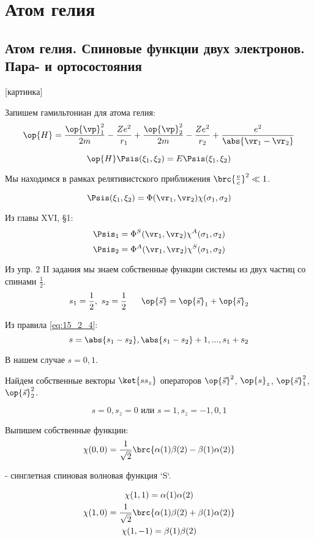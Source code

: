 \chapter{Атом гелия}

\section{Атом гелия. Спиновые функции двух электронов. Пара- и ортосостояния}

[картинка]

Запишем гамильтониан для атома гелия:
\begin{equation}
\label{eq:17_1_1}
\op{H} = \frac{\op{\vp}_1^2}{2m} - \frac{Ze^2}{r_1} + \frac{\op{\vp}_2^2}{2m} - \frac{Ze^2}{r_2} + \frac{e^2}{\abs{\vr_1 - \vr_2}}
\end{equation}

\begin{equation}
\label{eq:17_1_2}
\op{H} \Psis(\xi_1, \xi_2) =E\Psis(\xi_1, \xi_2)
\end{equation}

Мы находимся в рамках релятивистского приближения $\brc{\frac{v}{c}}^2 \ll 1$.

$$
\Psis(\xi_1, \xi_2) = \Phi(\vr_1, \vr_2) \chi(\sigma_1, \sigma_2)
$$

Из главы XVI, \S1:
$$
\Psis_1 = \Phi^S(\vr_1, \vr_2) \chi^A(\sigma_1, \sigma_2)
$$
$$
\Psis_2 = \Phi^A(\vr_1, \vr_2) \chi^S(\sigma_1, \sigma_2)
$$

Из упр. 2 II задания мы знаем собственные функции системы из двух частиц со спинами $\frac{1}{2}$.
$$
s_1=\frac{1}{2}, ~ s_2=\frac{1}{2}~~~~~\op{\vec{s}} = \op{\vec{s}} _1 + \op{\vec{s}}_2
$$

Из правила \eqref{eq:15_2_4}:
$$
s = \abs{s_1 - s_2}, \abs{s_1 - s_2} + 1, ..., s_1+s_2 
$$

В нашем случае $s = 0, 1$.

Найдем собственные векторы $\ket{s s_z}$ операторов $\op{\vec{s}}^2$, $\op{s}_z$, $\op{\vec{s}}_1^2$, $\op{\vec{s}}_2^2$.

$$
s = 0, s_z = 0 \text{    или    } s = 1, s_z=-1, 0, 1
$$

Выпишем собственные функции:
$$
\chi(0, 0) = \frac{1}{\sqrt{2}}\brc{\alpha(1)\beta(2) - \beta(1)\alpha(2)}
$$

- синглетная спиновая волновая функция `S`.

\begin{gather*}
\chi(1, 1) = \alpha(1)\alpha(2) \\
\chi(1, 0) = \frac{1}{\sqrt{2}}\brc{\alpha(1)\beta(2) + \beta(1)\alpha(2)} \\
\chi(1, -1) = \beta(1)\beta(2)
\end{gather*}

